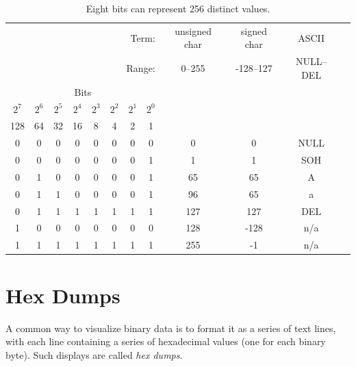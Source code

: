 \begin{table}
\begin{tabular}{cccccccc|c|c|c|c}
\multicolumn{8}{r}{                       Term:}  & unsigned char & signed char & ASCII \\
\multicolumn{8}{r}{                       Range:} & 0--255      & -128--127 & NULL--DEL\\
\cline{9-11}\multicolumn{8}{c}{Bits}                          &        &               &             &          \\
$2^7$ & $2^6$ & $2^5$ & $2^4$ & $2^3$ & $2^2$ & $2^1$ & $2^0$  &        &               &             &          \\
  128 &    64 &   32 &    16 &     8 &     4 &     2 &     1  &        &               &             &          \\
\hline
    0 &     0 &    0 &     0 &     0 &     0 &     0 &     0 &            0  &            0  &   NULL     \\
    0 &     0 &    0 &     0 &     0 &     0 &     0 &     1 &            1  &            1  &   SOH      \\
    0 &     1 &    0 &     0 &     0 &     0 &     0 &     1 &           65  &           65  &   A        \\
    0 &     1 &    1 &     0 &     0 &     0 &     0 &     1 &           96  &           65  &   a        \\
    0 &     1 &    1 &     1 &     1 &     1 &     1 &     1 &           127 &          127  &   DEL      \\
    1 &     0 &    0 &     0 &     0 &     0 &     0 &     0 &           128 &         -128  &   n/a      \\
    1 &     1 &    1 &     1 &     1 &     1 &     1 &     1 &           255 &           -1  &   n/a      \\
\end{tabular}
\caption{Eight bits can represent 256 distinct values.}\label{tab:8bits}
\end{table}



\section{Hex Dumps}\label{sec:hex-dumps}
A common way to visualize binary data is to format it as a series of
text lines, with each line containing a series of hexadecimal values (one
for each binary byte). Such displays are called \emph{hex
  dumps}.

